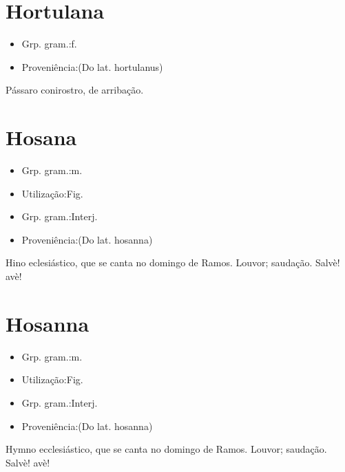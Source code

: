 \documentclass{article}
\begin{document}
\section{Hortulana}
\begin{itemize}
\item {Grp. gram.:f.}
\end{itemize}
\begin{itemize}
\item {Proveniência:(Do lat. \textunderscore hortulanus\textunderscore )}
\end{itemize}
Pássaro conirostro, de arribação.
\section{Hosana}
\begin{itemize}
\item {Grp. gram.:m.}
\end{itemize}
\begin{itemize}
\item {Utilização:Fig.}
\end{itemize}
\begin{itemize}
\item {Grp. gram.:Interj.}
\end{itemize}
\begin{itemize}
\item {Proveniência:(Do lat. \textunderscore hosanna\textunderscore )}
\end{itemize}
Hino eclesiástico, que se canta no domingo de Ramos.
Louvor; saudação.
Salvè! avè!
\section{Hosanna}
\begin{itemize}
\item {Grp. gram.:m.}
\end{itemize}
\begin{itemize}
\item {Utilização:Fig.}
\end{itemize}
\begin{itemize}
\item {Grp. gram.:Interj.}
\end{itemize}
\begin{itemize}
\item {Proveniência:(Do lat. \textunderscore hosanna\textunderscore )}
\end{itemize}
Hymno ecclesiástico, que se canta no domingo de Ramos.
Louvor; saudação.
Salvè! avè!
\end{document}

